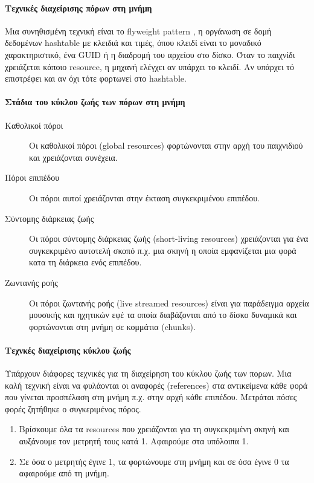 \paragraph{Τεχνικές διαχείρισης πόρων στη μνήμη}
Μια συνηθισμένη τεχνική είναι το flyweight pattern \cite{Gamma:1995:DPE:186897}, η οργάνωση σε δομή δεδομένων hashtable με κλειδιά και τιμές, όπου κλειδί είναι το μοναδικό χαρακτηριστικό, ένα GUID ή η διαδρομή του αρχείου στο δίσκο. Όταν το παιχνίδι χρειάζεται κάποιο resource, η μηχανή ελέγχει αν υπάρχει το κλειδί. Αν υπάρχει τό επιστρέφει και αν όχι τότε φορτωνεί στο hashtable.

\paragraph{Στάδια του κύκλου ζωής των πόρων στη μνήμη}
\begin{description}
\item [Καθολικοί πόροι] Οι καθολικοί πόροι (global resources) φορτώνονται στην αρχή του παιχνιδιού και χρειάζονται συνέχεια.
\item [Πόροι επιπέδου] Οι πόροι αυτοί χρειάζονται στην έκταση συγκεκριμένου επιπέδου.
\item [Σύντομης διάρκειας ζωής] Οι πόροι σύντομης διάρκειας ζωής (short-living resources) χρειάζονται για ένα συγκεκριμένο αυτοτελή σκοπό π.χ. μια σκηνή η οποία εμφανίζεται μια φορά κατα τη διάρκεια ενός επιπέδου.
\item [Zωντανής ροής] Οι πόροι ζωντανής ροής (live streamed resources) είναι για παράδειγμα αρχεία μουσικής και ηχητικών εφέ τα οποία διαβάζονται από το δίσκο δυναμικά και φορτώνονται στη μνήμη σε κομμάτια (chunks).
\end{description}

\paragraph{Τεχνκές διαχείρισης κύκλου ζωής}
Υπάρχουν διάφορες τεχνικές για τη διαχείρηση του κύκλου ζωής των πορων. Μια καλή τεχνική είναι να φυλάονται οι αναφορές (references) στα αντικείμενα κάθε φορά που γίνεται προσπέλαση στη μνήμη π.χ. στην αρχή κάθε επιπέδου.
Μετράται πόσες φορές ζητήθηκε ο συγκεριμένος πόρος.  
\begin{enumerate}
	\item Βρίσκουμε όλα τα resources που χρειάζονται για τη συγκεκριμένη σκηνή και αυξάνουμε τον μετρητή τους κατά 1. Αφαιρούμε στα υπόλοιπα 1.
	\item Σε όσα ο μετρητής έγινε 1, τα φορτώνουμε στη μνήμη και σε όσα έγινε 0 τα αφαιρούμε από τη μνήμη.
\end{enumerate}

